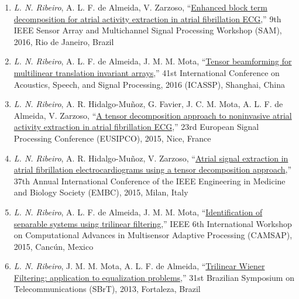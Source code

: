 \begin{enumerate}
	\item \emph{L. N. Ribeiro}, A. L. F. de Almeida, V. Zarzoso, ``\href{https://doi.org/10.1109/SAM.2016.7569709}{Enhanced block term decomposition for atrial activity extraction in atrial fibrillation ECG},'' 9th IEEE Sensor Array and Multichannel Signal Processing Workshop (SAM), 2016, Rio de Janeiro, Brazil
	
	\item \emph{L. N. Ribeiro},  A. L. F. de Almeida, J. M. M. Mota, ``\href{https://doi.org/10.1109/ICASSP.2016.7472221}{Tensor beamforming for multilinear translation invariant arrays},'' 41st International Conference on Acoustics, Speech, and Signal Processing, 2016 (ICASSP), Shanghai, China
	
	\item  \emph{L. N. Ribeiro}, A. R. Hidalgo-Mu\~{n}oz, G. Favier, J. C. M. Mota, A. L. F. de Almeida,  V. Zarzoso, ``\href{https://doi.org/10.1109/EUSIPCO.2015.7362850}{A tensor decomposition approach to noninvasive atrial activity extraction in atrial fibrillation ECG},'' 23rd European Signal Processing Conference (EUSIPCO), 2015, Nice, France
	
	\item \emph{L. N. Ribeiro}, A. R. Hidalgo-Mu\~{n}oz, V. Zarzoso, ``\href{https://doi.org/10.1109/EMBC.2015.7320000}{Atrial signal extraction in atrial fibrillation electrocardiograms using a tensor decomposition approach},'' 37th Annual International Conference of the IEEE Engineering in Medicine and Biology Society (EMBC), 2015, Milan, Italy
	
	 \item \emph{L. N. Ribeiro},  A. L. F. de Almeida, J. M. M. Mota, ``\href{https://doi.org/10.1109/CAMSAP.2015.7383768}{Identification of separable systems using trilinear filtering},'' IEEE 6th International Workshop on Computational Advances in Multisensor Adaptive Processing (CAMSAP), 2015, Canc\'{u}n, Mexico
	
	 \item \emph{L. N. Ribeiro}, J. M. M. Mota, A. L. F. de Almeida, ``\href{https://github.com/lnribeiro/lnribeiro.github.io/blob/master/assets/pdf/sbrt13.pdf}{Trilinear Wiener Filtering: application to equalization problems},''  31st Brazilian Symposium on Telecommunications (SBrT), 2013, Fortaleza, Brazil
\end{enumerate}
